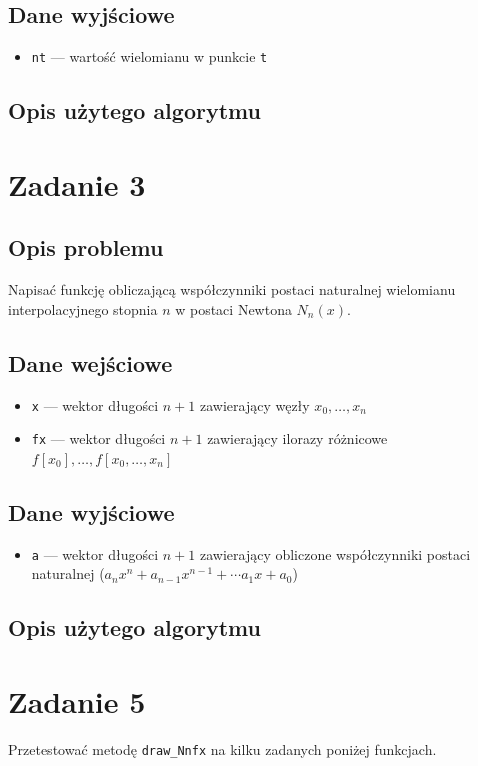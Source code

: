 \documentclass{article}
\begin{document}
\subsection*{Dane wyjściowe}
	\begin{itemize}
	    \item \texttt{nt} — wartość wielomianu w punkcie \texttt{t}
	\end{itemize}
\subsection*{Opis użytego algorytmu}

\section*{Zadanie 3}
\subsection*{Opis problemu}
	Napisać funkcję obliczającą współczynniki postaci naturalnej wielomianu interpolacyjnego stopnia $n$ w postaci Newtona $N_n(x)$.
\subsection*{Dane wejściowe}
	\begin{itemize}
	    \item \texttt{x} — wektor długości $n+1$ zawierający węzły $x_0,\dots,x_n$
	    \item \texttt{fx} — wektor długości $n+1$ zawierający ilorazy różnicowe $f[x_0], \dots, f[x_0,\dots,x_n]$
	\end{itemize}
\subsection*{Dane wyjściowe}
	\begin{itemize}
	    \item \texttt{a} — wektor długości $n+1$ zawierający obliczone współczynniki postaci naturalnej ($a_n x^n + a_{n-1} x^{n-1} + \cdots a_1 x + a_0$)
	\end{itemize}
\subsection*{Opis użytego algorytmu}

\section*{Zadanie 5}
	Przetestować metodę \texttt{draw\_Nnfx} na kilku zadanych poniżej funkcjach.
\end{document}
